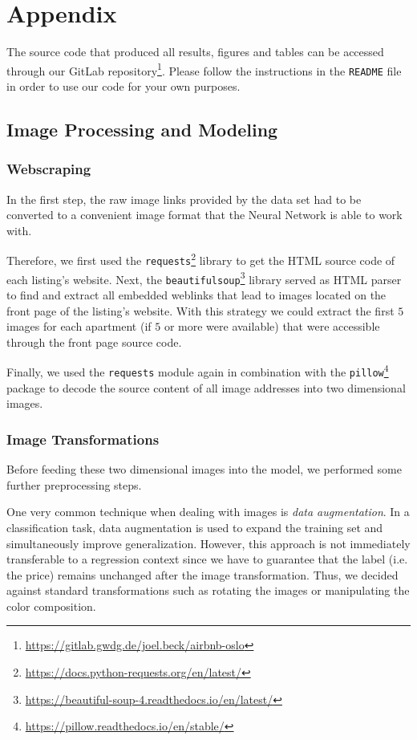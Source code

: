 \newpage
\appendix
\section{Appendix}

The source code that produced all results, figures and tables can be accessed through our GitLab repository\footnote{\url{https://gitlab.gwdg.de/joel.beck/airbnb-oslo}}.
Please follow the instructions in the \texttt{README} file in order to use our code for your own purposes.

\subsection{Image Processing and Modeling} \label{appendix:images}

\subsubsection{Webscraping}

In the first step, the raw image links provided by the data set had to be converted to a convenient image format that the Neural Network is able to work with.

Therefore, we first used the \texttt{requests}\footnote{\url{https://docs.python-requests.org/en/latest/}} library to get the HTML source code of each listing's website.
Next, the \texttt{beautifulsoup}\footnote{\url{https://beautiful-soup-4.readthedocs.io/en/latest/}} library served as HTML parser to find and extract all embedded weblinks that lead to images located on the front page of the listing's website.
With this strategy we could extract the first $5$ images for each apartment (if $5$ or more were available) that were accessible through the front page source code.

Finally, we used the \texttt{requests} module again in combination with the \texttt{pillow}\footnote{\url{https://pillow.readthedocs.io/en/stable/}} package to decode the source content of all image addresses into two dimensional images.

\subsubsection{Image Transformations}

Before feeding these two dimensional images into the model, we performed some further preprocessing steps.

One very common technique when dealing with images is \emph{data augmentation}.
In a classification task, data augmentation is used to expand the training set and simultaneously improve generalization. However, this approach is not immediately transferable to a regression context since we have to guarantee that the label (i.e. the price) remains unchanged after the image transformation.
Thus, we decided against standard transformations such as rotating the images or manipulating the color composition.

